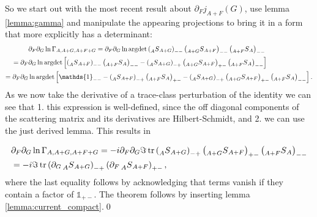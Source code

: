 \documentclass[oneside,reqno,12pt]{amsart}
\DeclareMathOperator{\tr}{tr}
\begin{document}
So we start out with the most recent result about \(\partial_F j_{A+F}(G)\), use lemma \ref{lemma:gamma} and manipulate the appearing projections to bring it in a form that more explicitly has a determinant:
\begin{align*}
&\partial_F \partial_G \ln \Gamma_{A,A+G,A+F+G} =
\partial_F \partial_G \ln \text{argdet} \left( \prescript{}{A}{S}_{A+G}\right)_{--} \left( \prescript{}{A+G}{S}_{A+F}\right)_{--} \left( \prescript{}{A+F}{S}_{A}\right)_{--}\\
=\partial_F& \partial_G \ln \text{argdet} \left[ \left( \prescript{}{A}{S}_{A+F}\right)_{--}\left(\prescript{}{A+F}{S}_A\right)_{--} - \left( \prescript{}{A}{S}_{A+G}\right)_{-+} \left( \prescript{}{A+G}{S}_{A+F}\right)_{+-} \left( \prescript{}{A+F}{S}_{A}\right)_{--}\right]\\
=\partial_F \partial_G & \ln \text{argdet} \left[\mathds{1}_{--}- \left( \prescript{}{A}{S}_{A+F}\right)_{-+}\left(\prescript{}{A+F}{S}_A\right)_{+-} - \left( \prescript{}{A}{S}_{A+G}\right)_{-+} \left( \prescript{}{A+G}{S}_{A+F}\right)_{+-} \left( \prescript{}{A+F}{S}_{A}\right)_{--}\right].
\end{align*}
As we now take the derivative of a trace-class perturbation of the identity we can see that 1. this expression is well-defined, since the off diagonal components of the scattering matrix and its derivatives are Hilbert-Schmidt,  and 2. we can use the just derived lemma. This results in 

\begin{align*}
&\partial_F \partial_G \ln \Gamma_{A,A+G,A+F+G} =
- i \partial_F \partial_G \Im \tr  \left( \prescript{}{A}{S}_{A+G}\right)_{-+} \left( \prescript{}{A+G}{S}_{A+F}\right)_{+-} \left( \prescript{}{A+F}{S}_{A}\right)_{--}\\
&=- i \Im \tr \left( \partial_G \prescript{}{A}{S}_{A+G}\right)_{-+} \left(\partial_F \prescript{}{A}{S}_{A+F}\right)_{+-},
\end{align*}
where the last equality follows by acknowledging that terms vanish if they contain a factor of \(\mathds{1}_{+-}\).
The theorem follows by inserting lemma \ref{lemma:current_compact}.\qed 
\end{document}
